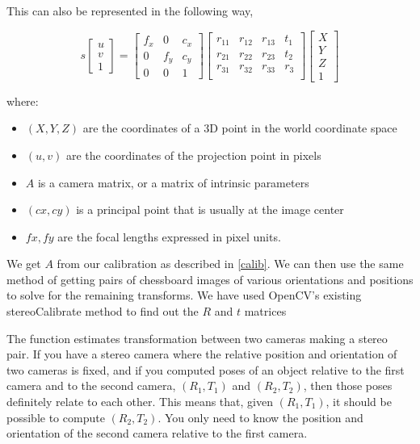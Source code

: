 \documentclass[11pt]{report}
\begin{document}
This can also be represented in the following way,

\begin{equation}
s\begin{bmatrix}
u \\ v \\1
\end{bmatrix}
=\begin{bmatrix}
f_x & 0 & c_x\\
0 & f_y & c_y\\
0 & 0 & 1
\end{bmatrix}
\begin{bmatrix}
r_{11} & r_{12} & r_{13} & t_1\\
r_{21} & r_{22} & r_{23} & t_2\\
r_{31} & r_{32} & r_{33} & r_3\\

\end{bmatrix}
\begin{bmatrix}
X \\ Y \\ Z \\ 1
\end{bmatrix}
\end{equation}

where:
\begin{itemize}



  \item      $(X, Y, Z)$ are the coordinates of a 3D point in the world coordinate space
  \item      $(u, v)$ are the coordinates of the projection point in pixels
  \item      $A$ is a camera matrix, or a matrix of intrinsic parameters
  \item      $(cx, cy)$ is a principal point that is usually at the image center
  \item      $fx, fy$ are the focal lengths expressed in pixel units.

\end{itemize}

We get $A$ from our calibration as described in \ref{calib}. We can then use the same method of getting pairs of chessboard images of various orientations and positions to solve for the remaining transforms. We have used OpenCV's existing stereoCalibrate method to find out the $R$ and $t$ matrices\cite{opencvdoc} 

The function estimates transformation between two cameras making a stereo pair. If you have a stereo camera where the relative position and orientation of two cameras is fixed, and if you computed poses of an object relative to the first camera and to the second camera, $(R_1, T_1)$ and $(R_2, T_2)$, then those poses definitely relate to each other. This means that, given $( R_1,T_1 )$, it should be possible to compute $( R_2,T_2 )$. You only need to know the position and orientation of the second camera relative to the first camera.
\end{document}
